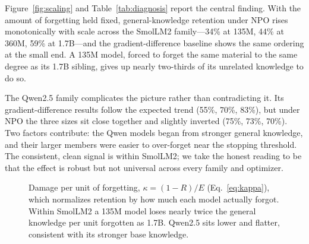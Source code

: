 \documentclass[sigconf,nonacm]{acmart}
\begin{document}
Figure~\ref{fig:scaling} and Table~\ref{tab:diagnosis} report the central finding. With the amount of forgetting held fixed, general-knowledge retention under NPO rises monotonically with scale across the SmolLM2 family---34\% at 135M, 44\% at 360M, 59\% at 1.7B---and the gradient-difference baseline shows the same ordering at the small end. A 135M model, forced to forget the same material to the same degree as its 1.7B sibling, gives up nearly two-thirds of its unrelated knowledge to do so.

The Qwen2.5 family complicates the picture rather than contradicting it. Its gradient-difference results follow the expected trend (55\%, 70\%, 83\%), but under NPO the three sizes sit close together and slightly inverted (75\%, 73\%, 70\%). Two factors contribute: the Qwen models began from stronger general knowledge, and their larger members were easier to over-forget near the stopping threshold. The consistent, clean signal is within SmolLM2; we take the honest reading to be that the effect is robust but not universal across every family and optimizer.

\begin{figure}[t]
\centering
{}
\caption{Damage per unit of forgetting, $\kappa=(1-R)/E$ (Eq.~\eqref{eq:kappa}), which normalizes retention by how much each model actually forgot. Within SmolLM2 a 135M model loses nearly twice the general knowledge per unit forgotten as 1.7B. Qwen2.5 sits lower and flatter, consistent with its stronger base knowledge.}
\label{fig:kappa}
\end{figure}
\end{document}
